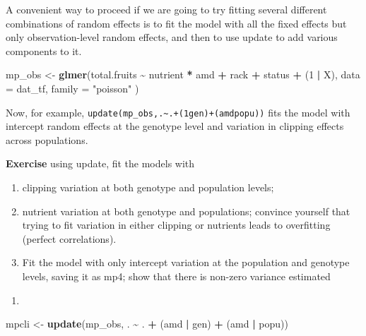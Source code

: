 \documentclass[
  12pt,
]{book}
\makeatletter
\newenvironment{Shaded}{\begin{snugshade}}{\end{snugshade}}
\newcommand{\DataTypeTok}[1]{\textcolor[rgb]{0.13,0.29,0.53}{#1}}
\newcommand{\DecValTok}[1]{\textcolor[rgb]{0.00,0.00,0.81}{#1}}
\newcommand{\KeywordTok}[1]{\textcolor[rgb]{0.13,0.29,0.53}{\textbf{#1}}}
\newcommand{\NormalTok}[1]{#1}
\newcommand{\OperatorTok}[1]{\textcolor[rgb]{0.81,0.36,0.00}{\textbf{#1}}}
\newcommand{\StringTok}[1]{\textcolor[rgb]{0.31,0.60,0.02}{#1}}
\providecommand{\tightlist}{%
  \setlength{\itemsep}{0pt}\setlength{\parskip}{0pt}}
\newenvironment{kframe}{%
\medskip{}
\setlength{\fboxsep}{.8em}
\def\at@end@of@kframe{}%
\ifinner\ifhmode%
 \def\at@end@of@kframe{\end{minipage}}%
 \begin{minipage}{\columnwidth}%
\fi\fi%
\def\FrameCommand##1{\hskip\@totalleftmargin \hskip-\fboxsep
\colorbox{incolor}{##1}\hskip-\fboxsep
    \hskip-\linewidth \hskip-\@totalleftmargin \hskip\columnwidth}%
\MakeFramed {\advance\hsize-\width
  \@totalleftmargin\z@ \linewidth\hsize
  \@setminipage}}%
{\par\unskip\endMakeFramed%
\at@end@of@kframe}
\newenvironment{rmdblock}[1]
 {
 \begin{itemize}
 \renewcommand{\labelitemi}{
   \raisebox{-.7\height}[0pt][0pt]{
     {\setkeys{Gin}{width=3em,keepaspectratio}\texttt{[image: images/icons/\#1]}}
   }
 }
 \begin{kframe}
 \setlength{\fboxsep}{1em}
 \item
 }
 {
 \end{kframe}
 \end{itemize}
 }
\newenvironment{rmdcode}
  {\begin{rmdblock}{code}}
  {\end{rmdblock}}
\makeatother
\begin{document}
A convenient way to proceed if we are going to try fitting several different combinations of random effects is to fit the model with all the fixed effects but only observation-level random effects, and then to use update to add various components to it.

\begin{Shaded}
\begin{Highlighting}[]
\NormalTok{mp\_obs \textless{}{-}}\StringTok{ }\KeywordTok{glmer}\NormalTok{(total.fruits }\OperatorTok{\textasciitilde{}}\StringTok{ }\NormalTok{nutrient }\OperatorTok{*}\StringTok{ }\NormalTok{amd }\OperatorTok{+}
\StringTok{  }\NormalTok{rack }\OperatorTok{+}\StringTok{ }\NormalTok{status }\OperatorTok{+}
\StringTok{  }\NormalTok{(}\DecValTok{1} \OperatorTok{|}\StringTok{ }\NormalTok{X),}
\DataTypeTok{data =}\NormalTok{ dat\_tf, }\DataTypeTok{family =} \StringTok{"poisson"}
\NormalTok{)}
\end{Highlighting}
\end{Shaded}

Now, for example, \texttt{update(mp\_obs,.\textasciitilde{}.+(1\textbar{}gen)+(amd\textbar{}popu))} fits the model with intercept random effects at the genotype level and variation in clipping effects across populations.

\begin{rmdcode}
\textbf{Exercise} using update, fit the models with

\begin{enumerate}
\def\labelenumi{\arabic{enumi}.}
\tightlist
\item
  clipping variation at both genotype and population levels;
\item
  nutrient variation at both genotype and populations; convince yourself that trying to fit variation in either clipping or nutrients leads to overfitting (perfect correlations).
\item
  Fit the model with only intercept variation at the population and genotype levels, saving it as mp4; show that there is non-zero variance estimated
\end{enumerate}
\end{rmdcode}

\begin{enumerate}
\def\labelenumi{\arabic{enumi}.}
\tightlist
\item
\end{enumerate}

\begin{Shaded}
\begin{Highlighting}[]
\NormalTok{mpcli \textless{}{-}}\StringTok{ }\KeywordTok{update}\NormalTok{(mp\_obs, . }\OperatorTok{\textasciitilde{}}\StringTok{ }\NormalTok{. }\OperatorTok{+}\StringTok{ }\NormalTok{(amd }\OperatorTok{|}\StringTok{ }\NormalTok{gen) }\OperatorTok{+}\StringTok{ }\NormalTok{(amd }\OperatorTok{|}\StringTok{ }\NormalTok{popu))}
\end{Highlighting}
\end{Shaded}
\end{document}
